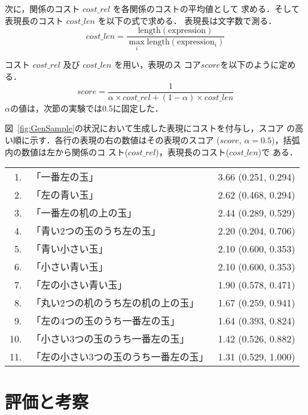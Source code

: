 \documentclass[japanese]{jnlp_1.2}
\begin{document}
次に，関係のコスト $\mathit{cost\_rel}$ を各関係のコストの平均値として
求める．そして表現長のコスト $\mathit{cost\_len}$ を以下の式で求める．
表現長は文字数で測る．
\begin{displaymath}
  \mathit{cost\_len} = \frac{\mathrm{length(expression)}}
  {\max_i \mathrm{length(expression_{\mathit{i}})}}
\end{displaymath}

コスト $\mathit{cost\_rel}$ 及び $\mathit{cost\_len}$ を用い，表現のス
コア$\mathit{score}$を以下のように定める．
\begin{displaymath}
\mathit{score}=\frac{1}{\alpha \times \mathit{cost\_rel} +
  (1-\alpha) \times \mathit{cost\_len}}
\end{displaymath}
$\alpha$の値は，次節の実験では0.5に固定した．


図~\ref{fig:GenSample}の状況において生成した表現にコストを付与し，スコア
の高い順に示す．各行の表現の右の数値はその表現のスコア ($\mathit{score}$, 
$\alpha=0.5$)，括弧内の数値は左から関係のコ
スト($\mathit{cost\_rel}$)，表現長のコスト($\mathit{cost\_len}$)で
ある．
\begin{flushleft}
  \begin{tabular}{rll}
    1.&「一番左の玉」&  3.66 (0.251, 0.294)\\
    2.&「左の青い玉」&  2.62 (0.468, 0.294)\\
    3.&「一番左の机の上の玉」&  2.44 (0.289, 0.529)\\
    4.&「青い2つの玉のうち左の玉」&  2.20 (0.204, 0.706)\\
    5.&「青い小さい玉」&  2.10 (0.600, 0.353)\\
    6.&「小さい青い玉」&  2.10 (0.600, 0.353)\\
    7.&「左の小さい青い玉」&  1.90 (0.578, 0.471)\\
    8.&「丸い2つの机のうち左の机の上の玉」&  1.67 (0.259, 0.941)\\
    9.&「左の4つの玉のうち一番左の玉」&  1.64 (0.393, 0.824)\\
    10.&「小さい3つの玉のうち一番左の玉」&  1.42 (0.526, 0.882)\\
    11.&「左の小さい3つの玉のうち一番左の玉」&  1.31 (0.529, 1.000)\\
  \end{tabular}
\end{flushleft}



\section{評価と考察}\label{sec:EvalAndDiscussion}
\end{document}
